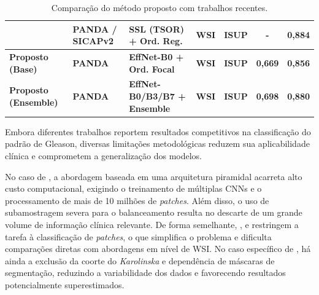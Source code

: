 \begin{table}[htb]
{\begin{tabular}{llllccc}
			\cite{bhattacharyya2026tsor}
			& PANDA / SICAPv2
			& SSL (TSOR) + Ord. Reg.
			& WSI
			& ISUP
			& -
			& 0,884 \\ 
			
			\midrule
			
			\textbf{Proposto (Base)} 
			& \textbf{PANDA} 
			& \textbf{EffNet-B0 + Ord. Focal} 
			& \textbf{WSI}
			& \textbf{ISUP} 
			& \textbf{0,669} 
			& \textbf{0,856} \\
			
			\textbf{Proposto (Ensemble)} 
			& \textbf{PANDA} 
			& \textbf{EffNet-B0/B3/B7 + Ensemble} 
			& \textbf{WSI}
			& \textbf{ISUP} 
			& \textbf{0,698} 
			& \textbf{0,880} \\
			
			\bottomrule
		\end{tabular}
	}
	
	\caption{Comparação do método proposto com trabalhos recentes.}
	\label{tab:comparacao_estado_arte}
\end{table}

Embora diferentes trabalhos reportem resultados competitivos na classificação do padrão de Gleason, diversas limitações metodológicas reduzem sua aplicabilidade clínica e comprometem a generalização dos modelos.

No caso de \cite{pyramidalcnn}, a abordagem baseada em uma arquitetura piramidal acarreta alto custo computacional, exigindo o treinamento de múltiplas CNNs e o processamento de mais de 10 milhões de \textit{patches}. Além disso, o uso de subamostragem severa para o balanceamento resulta no descarte de um grande volume de informação clínica relevante. De forma semelhante, \cite{ikromjanov2021vit_prostate}, \cite{alici2024efficient} e \cite{kosoko2024xai_prostate} restringem a tarefa à classificação de \textit{patches}, o que simplifica o problema e dificulta comparações diretas com abordagens em nível de WSI. No caso específico de \cite{ikromjanov2021vit_prostate}, há ainda a exclusão da coorte do \textit{Karolinska} e dependência de máscaras de segmentação, reduzindo a variabilidade dos dados e favorecendo resultados potencialmente superestimados.

